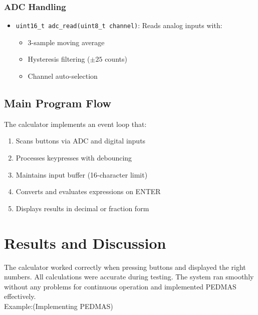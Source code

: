 \documentclass[journal]{IEEEtran}
\begin{document}
\subsubsection{ADC Handling}
\begin{itemize}
\item \texttt{uint16\_t adc\_read(uint8\_t channel)}:
Reads analog inputs with:
\begin{itemize}
\item 3-sample moving average
\item Hysteresis filtering ($\pm25$ counts)
\item Channel auto-selection
\end{itemize}
\end{itemize}

\subsection{Main Program Flow}
The calculator implements an event loop that:
\begin{enumerate}
\item Scans buttons via ADC and digital inputs
\item Processes keypresses with debouncing
\item Maintains input buffer (16-character limit)
\item Converts and evaluates expressions on ENTER
\item Displays results in decimal or fraction form
\end{enumerate}

\section{Results and Discussion}

The calculator worked correctly when pressing buttons and displayed the right numbers. All calculations were accurate during testing. The system ran smoothly without any problems for continuous operation and implemented PEDMAS effectively.\\
Example:(Implementing PEDMAS)\\
\end{document}
